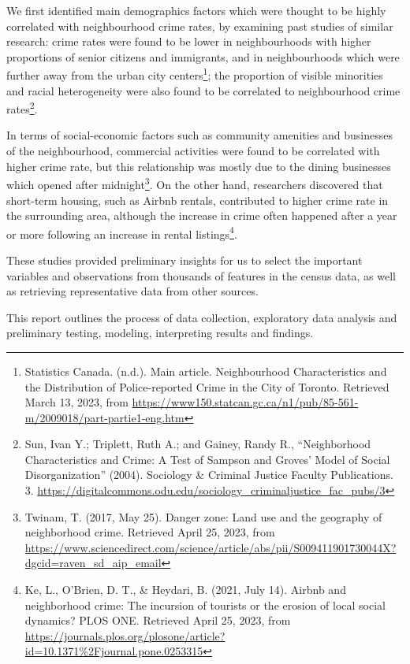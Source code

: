 \documentclass[
]{article}
\begin{document}
We first identified main demographics factors which were thought to be
highly correlated with neighbourhood crime rates, by examining past
studies of similar research: crime rates were found to be lower in
neighbourhoods with higher proportions of senior citizens and
immigrants, and in neighbourhoods which were further away from the urban
city centers\footnote{Statistics Canada. (n.d.). Main article.
  Neighbourhood Characteristics and the Distribution of Police-reported
  Crime in the City of Toronto. Retrieved March 13, 2023, from
  \url{https://www150.statcan.gc.ca/n1/pub/85-561-m/2009018/part-partie1-eng.htm}};
the proportion of visible minorities and racial heterogeneity were also
found to be correlated to neighbourhood crime rates\footnote{Sun, Ivan
  Y.; Triplett, Ruth A.; and Gainey, Randy R., ``Neighborhood
  Characteristics and Crime: A Test of Sampson and Groves' Model of
  Social Disorganization'' (2004). Sociology \& Criminal Justice Faculty
  Publications. 3.
  \url{https://digitalcommons.odu.edu/sociology_criminaljustice_fac_pubs/3}}.

In terms of social-economic factors such as community amenities and
businesses of the neighbourhood, commercial activities were found to be
correlated with higher crime rate, but this relationship was mostly due
to the dining businesses which opened after midnight\footnote{Twinam, T.
  (2017, May 25). Danger zone: Land use and the geography of
  neighborhood crime. Retrieved April 25, 2023, from
  \url{https://www.sciencedirect.com/science/article/abs/pii/S009411901730044X?dgcid=raven_sd_aip_email}}.
On the other hand, researchers discovered that short-term housing, such
as Airbnb rentals, contributed to higher crime rate in the surrounding
area, although the increase in crime often happened after a year or more
following an increase in rental listings\footnote{Ke, L., O'Brien, D.
  T., \& Heydari, B. (2021, July 14). Airbnb and neighborhood crime: The
  incursion of tourists or the erosion of local social dynamics? PLOS
  ONE. Retrieved April 25, 2023, from
  \url{https://journals.plos.org/plosone/article?id=10.1371\%2Fjournal.pone.0253315}}.

These studies provided preliminary insights for us to select the
important variables and observations from thousands of features in the
census data, as well as retrieving representative data from other
sources.

This report outlines the process of data collection, exploratory data
analysis and preliminary testing, modeling, interpreting results and
findings.
\end{document}
